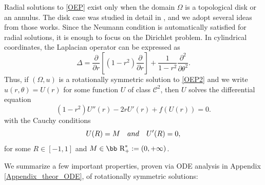 \documentclass[11pt]{article}
\def\r{\hbox{\bb R}}
\numberwithin{equation} {section}
\begin{document}
Radial solutions to \eqref{OEP} exist only when the domain $\Omega$ is a topological disk or an annulus. The disk case was studied in detail in \cite{EM,Sh}, and we adopt several ideas from those works. Since the Neumann condition is automatically satisfied for radial solutions, it is enough to focus on the Dirichlet problem. In cylindrical coordinates, the Laplacian operator can be expressed as
\[
\Delta =  \frac{\partial}{\partial r} \left[(1-r^2) \frac{\partial}{\partial r} \right]+\frac{1}{1-r^2} \frac{\partial ^2}{\partial \theta ^2}.
\]
Thus, if $(\Omega, u)$ is a rotationally symmetric solution to \eqref{OEP2} and we write  $u(r,\theta)=U(r)$ for some function $U$ of class $\mathcal{C}^2$, then $U$ solves the differential equation
\begin{equation}\label{ODE}
	(1-r^2) U'' (r)- 2 r U' (r)+f(U(r))=0.
\end{equation}with the Cauchy conditions 
\begin{equation}\label{CauchyData}
	U(R)=M \quad \textup{and} \quad U' (R)=0,
\end{equation}
for some $R \in [-1,1]$ and $M \in \r_+^* := (0,+\infty)$.

We summarize a few important properties, proven via ODE analysis in Appendix \ref{Appendix_theor_ODE}, of rotationally symmetric solutions:
\end{document}
